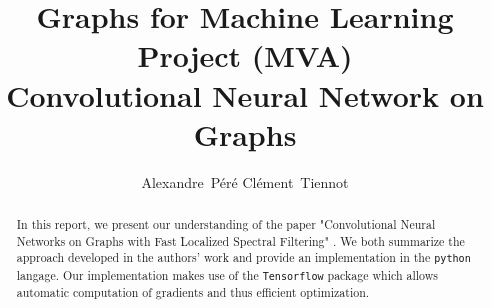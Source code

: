 \documentclass{article}
\title{Graphs for Machine Learning Project (MVA)\\Convolutional Neural Network on Graphs}
\author{Alexandre~P\'er\'e \And Cl\'ement~Tiennot}
\begin{document}

\maketitle

\begin{abstract}
    In this report, we present our understanding of the paper "Convolutional Neural Networks on Graphs with Fast Localized Spectral Filtering" \cite{defferrard2016convolutional}. We both summarize the approach developed in the authors' work and provide an implementation in the \texttt{python} langage. Our implementation makes use of the \texttt{Tensorflow} package \cite{tensorflow2015-whitepaper} which allows automatic computation of gradients and thus efficient optimization.
\end{abstract}






 












\end{document}
